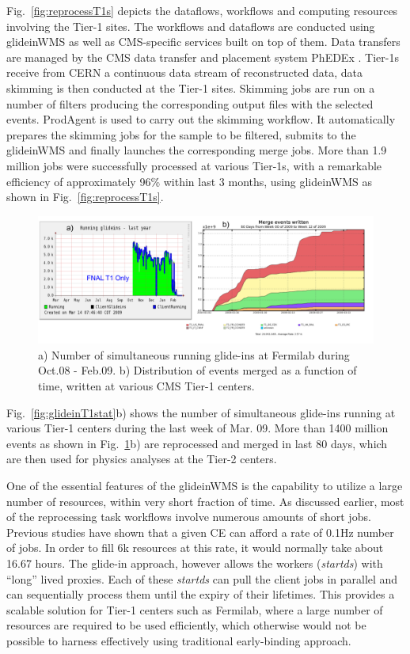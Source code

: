 \documentclass[a4paper]{jpconf}
\begin{document}
Fig.~\ref{fig:reprocessT1s} depicts the dataflows, workflows and computing resources involving the Tier-1 sites.
The workflows and dataflows are conducted using glideinWMS  as well as CMS-specific services 
built on top of them. Data transfers are managed by the CMS data transfer and placement 
system PhEDEx \cite{bib:cms_phedex}. Tier-1s receive from CERN a continuous data stream of reconstructed data, data skimming 
is then conducted at the Tier-1 sites. Skimming jobs are run on a number of filters producing the 
corresponding output files with the selected events. ProdAgent is used to carry out the skimming workflow. 
It automatically prepares the skimming jobs for the sample to be filtered, submits to the glideinWMS and finally
launches the corresponding merge jobs. More than 1.9 million jobs were successfully processed at various 
Tier-1s, with a remarkable efficiency of approximately 96\% within last 3 months, using glideinWMS as shown 
in Fig.~\ref{fig:reprocessT1s}.
\begin{figure}
\begin{center}
\includegraphics[scale=0.55]{merged_events}
\end{center}
\caption{a) Number of simultaneous running glide-ins at Fermilab during Oct.08 - Feb.09. b) Distribution of 
events merged as a function of time, written at various CMS Tier-1 centers.}
\label{fig:merged_events}
\end{figure}
Fig.~\ref{fig:glideinT1stat}b) shows the number of simultaneous glide-ins running at various Tier-1 centers during the last week of Mar. 09. 
More than 1400 million events as shown in Fig.~\ref{fig:merged_events}b) are reprocessed and merged in last 80 days, which are then 
used for physics analyses at the Tier-2 centers. 

One of the essential features of the glideinWMS is the capability to utilize a large number of
resources, within very short fraction of time. As discussed earlier, most of the reprocessing task 
workflows involve numerous amounts of short jobs. Previous studies have shown that a given CE can 
afford a rate of 0.1Hz number of jobs. In order to fill 6k resources at this rate, it would normally take 
about 16.67 hours.  The glide-in approach, however allows the workers (\emph{startds}) with ``long'' lived proxies. 
Each of these \emph{startds} can pull the client jobs in parallel and can sequentially process them until 
the expiry of their lifetimes. This provides a scalable solution for Tier-1 centers such as Fermilab, 
where a large number of resources are required to be used efficiently, which otherwise would not 
be possible to harness effectively using traditional early-binding approach.
\end{document}
